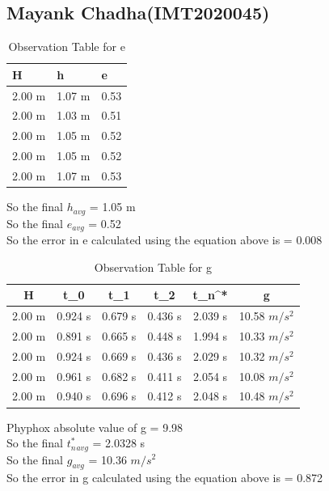 \documentclass[11pt]{scrartcl} %
\begin{document}
\subsection{Mayank Chadha(IMT2020045)}

\begin{table}[h] %
	\centering %
	\begin{tabular}{l l l}
		\toprule
		\textbf{H} & \textbf{h} & \textbf{e} \\
		\midrule
		2.00 m & 1.07 m & 0.53\\
        2.00 m & 1.03 m & 0.51\\
        2.00 m & 1.05 m & 0.52\\
        2.00 m & 1.05 m & 0.52\\
        2.00 m & 1.07 m & 0.53\\
		\bottomrule
	\end{tabular}
	\caption{Observation Table for e}
\end{table}
So the final $h_{avg}$ = 1.05 m\\
So the final $e_{avg}$ = 0.52\\
So the error in e calculated using the equation above is  = 0.008 

\begin{table}[h]
\centering
\begin{tabular}{||c c c c c c||} 
\toprule
 \hline
 H & t_0 & t_1 & t_2 & t_n^* & g \\ [0.5ex] 
 \midrule
 \hline\hline
 2.00 m & 0.924 s & 0.679 s  & 0.436 s & 2.039 s & 10.58 $m/s^2$  \\ 
 \hline
 2.00 m & 0.891 s & 0.665 s & 0.448 s & 1.994 s & 10.33 $m/s^2$  \\
 \hline
 2.00 m & 0.924 s & 0.669 s & 0.436 s & 2.029 s  & 10.32 $m/s^2$   \\
 \hline
 2.00 m & 0.961 s & 0.682 s & 0.411 s & 2.054 s  & 10.08 $m/s^2$   \\
 \hline
 2.00 m & 0.940 s & 0.696 s & 0.412 s & 2.048 s  & 10.48 $m/s^2$  \\ [1ex]
 \bottomrule
 \hline
\end{tabular}
\caption{Observation Table for g}
\end{table}
Phyphox absolute value of g = 9.98 \\
So the final $t_n^*_{avg}$ = 2.0328 s\\
So the final $g_{avg}$ = 10.36 $m/s^2$\\
So the error in g calculated using the equation above is  = 0.872 \\
\end{document}
